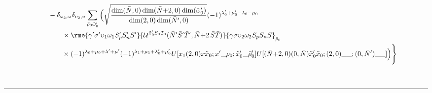 \documentclass[%
  aps,%
  prc,%
  showpacs,%
  superscriptaddress,%
  onecolumn,%
  notitlepage,%
  11pt,%
  floatfix,%
  amsmath,%
  amssymb,%
]{revtex4-2}
\newcommand{\plus}{\text{+}}
\begin{document}
{{\begin{align*}
  &\qquad-
  \delta_{\omega_2,\omega}\delta_{\upsilon_2,\upsilon}
  \sum_{\bar{\rho}_0\tilde{\omega}_0'}\Big(
  \sqrt{\frac{\dim(\bar{N},0)\dim(\bar{N}\plus2,0)\dim(\tilde{\omega}_0')}{\dim(2,0)\dim(\bar{N}',0)}}
  (-1)^{\lambda_0'+\mu_0'-\lambda_0-\mu_0}
  \\
  & \qquad \qquad \times
  \rme{\gamma'\sigma'\upsilon_1\omega_1S_p'S_n'S'}{\mathcal{U}^{\tilde{x}_0' S_0 T_0}(\bar{N}'\bar{S}'\bar{T}',\bar{N}\plus2\,\bar{S}\bar{T})}{\gamma \sigma \upsilon_2 \omega_2 S_p S_n S}_{\bar{\rho}_0}\\
  &\qquad\qquad\times
      (-1)^{\lambda_0+\mu_0+\lambda'+\mu'}(-1)^{\lambda_1+\mu_1+\lambda_0'+\mu_0'} U[x_1 (2,0) x \tilde{x}_0; x'\_\rho_0;\tilde{x}_0'\_\bar{\rho}_0']
      U[(\bar{N}\plus2,0)(0,\bar{N}) \tilde{x}_0' \tilde{x}_0;(2,0)\_\_;(0,\bar{N}')\_\_]
  \Big)\Bigg\}
\end{align*}
}}
\noindent\usebox\recurrenceB

\newpage\pagestyle{empty}

\noindent\usebox\recurrenceA
\vspace*{-4.5ex}\\
\noindent\rule{\textwidth}{1pt}\\
\vspace*{-5.5ex}
\noindent\usebox\recurrenceB

\end{document}
